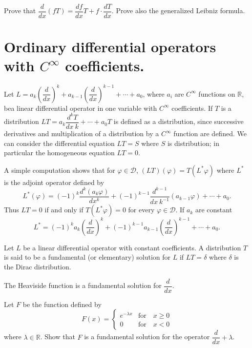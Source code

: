 \begin{exer*}
Prove that $\dfrac{d}{dx}(fT)=\dfrac{df}{dx}T+f\cdot \dfrac{dT}{dx}$. Prove also the generalized Leibniz formula.
\end{exer*}

\section*{Ordinary differential operators with $C^{\infty}$ coefficients.}

Let $L=a_{k}\left(\dfrac{d}{dx}\right)^{k}+a_{k-1}\left(\dfrac{d}{dx}\right)^{k-1}+\cdots + a_{0}$, where $a_{i}$ are $C^{\infty}$ functions on $\mathbb{R}$, be\pageoriginale a linear differential operator in one variable with $C^{\infty}$ coefficients. If $T$ is a distribution $LT=a_{k}\dfrac{d^{k}T}{dx \ k}+\cdots+a_{0}T$ is defined as a distribution, since successive derivatives and multiplication of a distribution by a $C^{\infty}$ function are defined. We can consider the differential equation $LT=S$ where $S$ is distribution; in particular the homogeneous equation $LT=0$. 

A simple computation shows that for $\varphi\in \mathcal{D}$, $(LT)(\varphi)=T(L^{\ast}\varphi)$ where $L^{\ast}$ is the adjoint operator defined by
$$
L^{\ast}(\varphi)=(-1)^{k}\dfrac{d^{k}(a_{k}\varphi)}{dx^{k}}+(-1)^{k-1}\dfrac{d^{k-1}}{dx \ k^{-1}}(a_{k-1}\varphi)+\cdots+a_{0}.
$$
Thus $LT=0$ if and only if $T(L^{\ast}\varphi)=0$ for every $\varphi\in \mathcal{D}$. If $a_{k}$ are constant
$$
L^{\ast}=(-1)^{k}a_{k}\left(\dfrac{d}{dx}\right)^{k}+(-1)^{k-1}a_{k-1}\left(\dfrac{d}{dx}\right)^{k-1}+\cdots+a_{0}.
$$

\begin{defi*}
Let $L$ be a linear differential operator with constant coefficients. A distribution $T$ is said to be a fundamental (or elementary) solution for $L$ if $LT=\delta$ where $\delta$ is the Dirac distribution.
\end{defi*}

\begin{example*}
The Heaviside function is a fundamental solution for $\dfrac{d}{dx}$.
\end{example*}

\begin{exer*}
Let $F$ be the function defined by
$$
F(x)=
\begin{cases}
e^{-\lambda x} & \text{for}\quad x\geq 0\\[3pt]
0 & \text{for}\quad x<0
\end{cases}
$$
where $\lambda \in \mathbb{R}$. Show that $F$ is a fundamental solution for the operator $\dfrac{d}{dx}+\lambda$.
\end{exer*}

